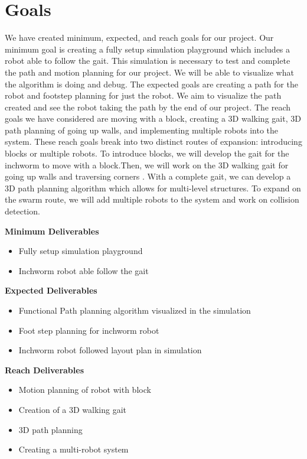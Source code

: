 \section{Goals}
We have created minimum, expected, and reach goals for our project. Our minimum goal is creating a fully setup simulation playground which includes a robot able to follow the gait. This simulation is necessary to test and complete the path and motion planning for our project. We will be able to visualize what the algorithm is doing and debug. The expected goals are creating a path for the robot and footstep planning for just the robot. We aim to visualize the path created and see the robot taking the path by the end of our project. The reach goals we have considered are moving with a block, creating a 3D walking gait, 3D path planning of going up walls, and implementing multiple robots into the system. These reach goals break into two distinct routes of expansion: introducing blocks or multiple robots. To introduce blocks, we will develop the gait for the inchworm to move with a block.Then, we will work on the 3D walking gait  for going up walls and traversing corners . With a complete gait, we can develop a 3D path planning algorithm which allows for multi-level structures.  To expand on the swarm route, we will add multiple robots to the system and work on collision detection.

\textbf{Minimum Deliverables}
\begin{itemize}
    \item Fully setup simulation playground
    \item Inchworm robot able follow the gait
\end{itemize}

\vspace{10pt}

\textbf{Expected Deliverables}
\begin{itemize}
    \item Functional Path planning algorithm visualized in the simulation
    \item Foot step planning for inchworm robot
    \item Inchworm robot followed layout plan in simulation
\end{itemize}

\textbf{Reach Deliverables}
\begin{itemize}
    \item Motion planning of robot with block
    \item Creation of a 3D walking gait 
    \item 3D path planning 
    \item Creating a multi-robot system
\end{itemize}

